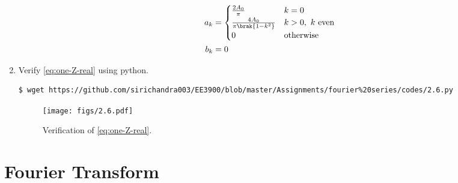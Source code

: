\documentclass[journal,12pt,twocolumn]{IEEEtran}
\renewcommand\thesection{\arabic{section}}
\begin{document}
\begin{enumerate}[label=\thesection.\arabic*,ref=\thesection.\theenumi]
\begin{align}
a_k &=
\begin{cases}
\frac{2A_0}{\pi} & k = 0 \\
\frac{4A_0}{\pi\brak{1 - k^2}} & k > 0,\ k\ \text{even} \\
0 & \text{otherwise}
\end{cases} \label{eq:ak-xt}\\
b_k &= 0
\label{eq:bk-xt}
\end{align}
\item Verify
\eqref{eq:one-Z-real}
using python. \\
\solution
\begin{lstlisting}
$ wget https://github.com/sirichandra003/EE3900/blob/master/Assignments/fourier%20series/codes/2.6.py
\end{lstlisting}
\begin{figure}[!ht]
\texttt{[image: figs/2.6.pdf]}
\caption{Verification of \eqref{eq:one-Z-real}.}
\label{fig:ver-real}
\end{figure}
\end{enumerate}
\section{Fourier Transform}
\end{document}
